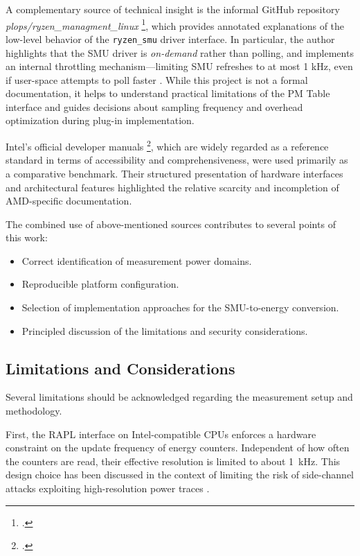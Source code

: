 A complementary source of technical insight is the informal GitHub
repository \\\emph{plops/ryzen\_managment\_linux}
\footcite{ryzen_managment_linux}, which provides annotated
explanations of the low-level behavior of the \texttt{ryzen\_smu} driver
interface. In particular, the author highlights that the \gls{SMU} driver is
\emph{on-demand} rather than polling, and implements an internal throttling
mechanism—limiting \gls{SMU} refreshes to at most 1 kHz, even if user-space
attempts to poll faster . While this project is not a formal documentation,
it helps to understand practical limitations of the \gls{PM} Table interface
and guides decisions about sampling frequency and overhead optimization
during plug-in implementation.

Intel’s official developer manuals \footcite{Intel_SDM}, which are widely
regarded as a reference standard in terms of accessibility and comprehensiveness,
were used primarily as a comparative benchmark. Their structured presentation
of hardware interfaces and architectural features highlighted the relative
scarcity and incompletion of AMD-specific documentation.

The combined use of above-mentioned sources contributes to several points of
this work:
\begin{itemize}
    \item Correct identification of measurement power domains.
    \item Reproducible platform configuration.
    \item Selection of implementation approaches for the \gls{SMU}-to-energy
        conversion.
    \item Principled discussion of the limitations and security considerations.
\end{itemize}

\subsection{Limitations and Considerations}
\label{sec:limncons}

Several limitations should be acknowledged regarding the measurement setup
and methodology.

First, the \gls{RAPL} interface on Intel-compatible \gls{CPU}s enforces a hardware
constraint on the update frequency of energy counters. Independent of how
often the counters are read, their effective resolution is limited to about
1~kHz. This design choice has been discussed in the context of limiting the
risk of side-channel attacks exploiting high-resolution power traces
\parencite{IntelRAPL, PwrLeak_2023}.

